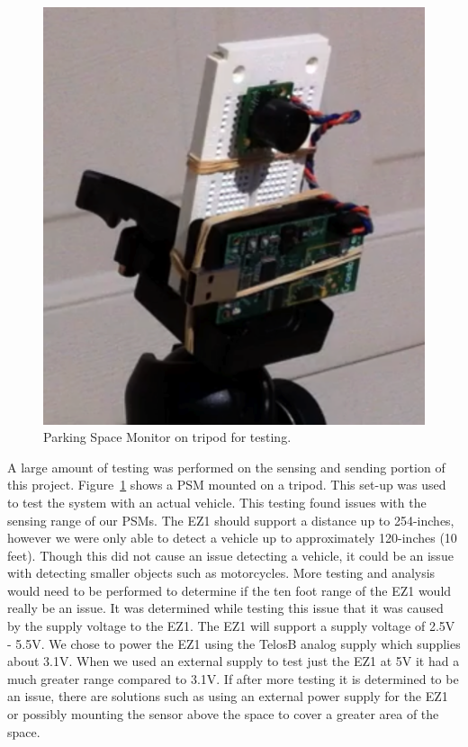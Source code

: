 \documentclass{acm_proc}
\begin{document}
\begin{figure}
    \begin{center}
		\includegraphics[width=\columnwidth]{figures/parking_sensor}
	\end{center}
	\caption{Parking Space Monitor on tripod for testing.}
	\label{fig:parking_sensor}
\end{figure}

A large amount of testing was performed on the sensing and sending portion
of this project.
Figure~\ref{fig:parking_sensor} shows a PSM mounted on a
tripod.
This set-up was used to test the system with an actual vehicle.
This testing found issues with the sensing range of our PSMs.
The EZ1 should support a distance up to 254-inches, however we
were only able to detect a vehicle up to approximately 120-inches (10
feet).
Though this did not cause an issue detecting a vehicle, it could be an
issue with detecting smaller objects such as motorcycles.
More testing and analysis would need to be performed to determine if the
ten foot range of the EZ1 would really be an issue.
It was determined while testing this issue that it was caused by the supply
voltage to the EZ1.
The EZ1 will support a supply voltage of 2.5V - 5.5V.
We chose to power the EZ1 using the TelosB analog supply which
supplies about 3.1V.
When we used an external supply to test just the EZ1 at 5V it had a much
greater range compared to 3.1V.
If after more testing it is determined to be an issue, there are solutions
such as using an external power supply for the EZ1 or possibly mounting the
sensor above the space to cover a greater area of the space. 
\end{document}

